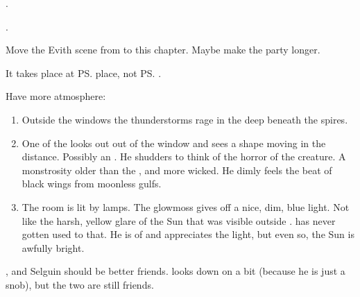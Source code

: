 \begin{garbage}
\begin{changes}
  \begin{comment}\paragraph{The Mutiny}\end{comment}
    . 
    
  \begin{comment}\paragraph{Ilcas Northstar}\end{comment}
    . 
  
  \begin{comment}\paragraph{Wanderer in Darkness}\end{comment}
    Move the Evith scene from  to this chapter. 
    Maybe make the party longer. 
    
    It takes place at \ps{\Teshrial} place, not \ps{\Ganethed}. 
    
    Have more atmosphere: 
    \begin{enumerate}
      \item 
        Outside the windows the thunderstorms rage in the deep beneath the spires. 
      \item 
        One of the \resphain looks out out of the window and sees a shape moving in the distance. 
        Possibly an \umbra. 
        He shudders to think of the horror of the creature. 
        A monstrosity older than the \resphain, and more wicked. 
        He dimly feels the beat of black wings from moonless gulfs. 
      \item 
        The room is lit by \hs{\glowmoss} lamps. 
        The glowmoss gives off a nice, dim, blue light. 
        Not like the harsh, yellow glare of the Sun that was visible outside \Nyx. 
        \Teshrial{} has never gotten used to that. 
        He is of \CiriathSepher{} and appreciates the light, but even so, the Sun is awfully bright. 
    \end{enumerate}
  
    \Teshrial, \Ganethed{} and Selguin should be better friends. 
    \Teshrial{} looks down on \Ganethed{} a bit (because he is just a snob), but the two are still friends. 
    

\end{changes}
\end{garbage}
